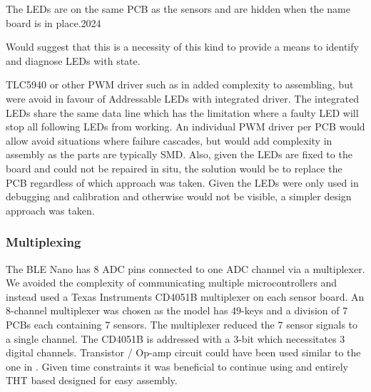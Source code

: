 The LEDs are on the same PCB as the sensors and are hidden when the
name board is in place.2024

Would suggest that this is a necessity of this kind to provide a means
to identify and diagnose LEDs with state.

TLC5940 or other PWM driver such as in \cite{McPherson2013} added
complexity to assembling, but were avoid in favour of Addressable LEDs
with integrated driver. The integrated LEDs share the same data line
which has the limitation where a faulty LED will stop all following LEDs
from working. An individual PWM driver per PCB would allow avoid
situations where failure cascades, but would add complexity in assembly
as the parts are typically SMD. Also, given the LEDs are fixed to the
board and could not be repaired in situ, the solution would be to
replace the PCB regardless of which approach was taken. Given the LEDs
were only used in debugging and calibration and otherwise would not be
visible, a simpler design approach was taken.

\subsubsection{Multiplexing}\label{multiplexing}


The BLE Nano has 8 ADC pins connected to one ADC channel via a multiplexer. 
We avoided the complexity of communicating multiple microcontrollers and instead used a Texas Instruments CD4051B multiplexer on each sensor board.
An 8-channel multiplexer was chosen as the model has 49-keys and a division of 7 PCBs each containing 7 sensors.
The multiplexer reduced the 7 sensor signals to a single channel. The CD4051B is addressed with a 3-bit which necessitates 3 digital channels.
Transistor / Op-amp circuit could have been used similar to the one in
\cite{McPherson2013}. Given time constraints it was beneficial to continue using and entirely THT based designed for easy assembly.




